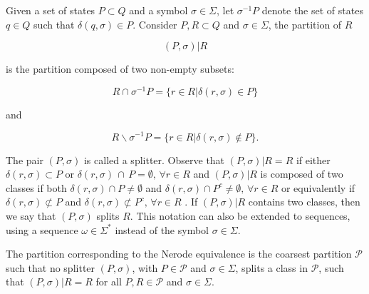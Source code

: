 {Given a set of states $P \subset Q$ and a symbol $\sigma \in \Sigma$, let $\sigma^{-1}\textit{P}$ denote the set of states $q\in Q$ such that $\delta(q, \sigma) \in P$. Consider $P, R\subset Q$ and $\sigma \in \Sigma$, the partition of $R$

\[
(P, \sigma)|R
\]

\noindent is the partition composed of two non-empty subsets:

\begin{equation}\label{eq:splitintersec}
R\cap\sigma^{-1}P = \{r \in R | \delta(r,\sigma) \in P\}
\end{equation}

\noindent and

\begin{equation}\label{eq:splitquot}
R\backslash\sigma^{-1}P = \{r \in R | \delta(r,\sigma) \notin P\}.
\end{equation}

\noindent The pair $(P, \sigma)$ is called a splitter. Observe that $(P, \sigma)|R = R$ if either $\delta(r,\sigma) \subset P$
or $\delta(r,\sigma)\,\cap\,P = \emptyset,\,\forall r \in R$ and $(P,\sigma)|R$ is composed of two classes if both $\delta(r,\sigma)\cap P  \neq \emptyset$ and
$\delta(r,\sigma)\cap P^c  \neq \emptyset, \,\forall r \in R$  or equivalently if $\delta(r,\sigma) \not\subset P $   and  $\delta(r,\sigma)\not\subset P^c, \, \forall r \in R $ . If $(P, \sigma)|R$ contains two classes, then we say that $(P, \sigma)$ splits $R$. This notation can also be extended to sequences, using a sequence $\omega \in \Sigma^*$ instead of the symbol $\sigma \in \Sigma$.

\begin{proposition}\label{prop:nerequiv}
The partition corresponding to the Nerode equivalence is the coarsest partition $\mathcal{P}$ such that no splitter $(P,\sigma)$, with $P \in \mathcal{P}$ and $\sigma \in \Sigma$, splits a class in $\mathcal{P}$, such that $(P,\sigma)|R = R$ for all $P, R \in \mathcal{P}$ and $\sigma \in \Sigma$.
\end{proposition}

 
%
%
%
}
